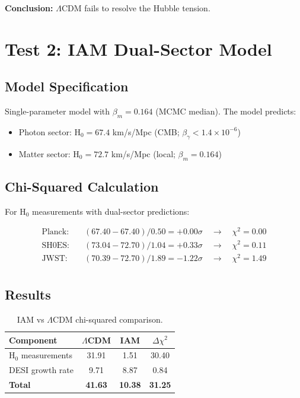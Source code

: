 \documentclass[11pt,letterpaper]{article}
\begin{document}
\noindent\textbf{Conclusion:} $\Lambda$CDM fails to resolve the Hubble tension.

\section{Test 2: IAM Dual-Sector Model}

\subsection{Model Specification}

Single-parameter model with $\beta_m = 0.164$ (MCMC median). The model predicts:

\begin{itemize}
\item Photon sector: H$_0 = 67.4$ km/s/Mpc (CMB; $\beta_\gamma < 1.4 \times 10^{-6}$)
\item Matter sector: H$_0 = 72.7$ km/s/Mpc (local; $\beta_m = 0.164$)
\end{itemize}

\subsection{Chi-Squared Calculation}

For H$_0$ measurements with dual-sector predictions:

\begin{align*}
\text{Planck:} \quad & (67.40 - 67.40)/0.50 = +0.00\sigma \quad \rightarrow \quad \chi^2 = 0.00 \\
\text{SH0ES:} \quad & (73.04 - 72.70)/1.04 = +0.33\sigma \quad \rightarrow \quad \chi^2 = 0.11 \\
\text{JWST:} \quad & (70.39 - 72.70)/1.89 = -1.22\sigma \quad \rightarrow \quad \chi^2 = 1.49 \\
\end{align*}

\subsection{Results}

\begin{table}[h]
\centering
\begin{tabular}{lccc}
\toprule
Component & $\Lambda$CDM & IAM & $\Delta\chi^2$ \\
\midrule
H$_0$ measurements & 31.91 & 1.51 & 30.40 \\
DESI growth rate & 9.71 & 8.87 & 0.84 \\
\midrule
\textbf{Total} & \textbf{41.63} & \textbf{10.38} & \textbf{31.25} \\
\bottomrule
\end{tabular}
\caption{IAM vs $\Lambda$CDM chi-squared comparison.}
\end{table}
\end{document}
